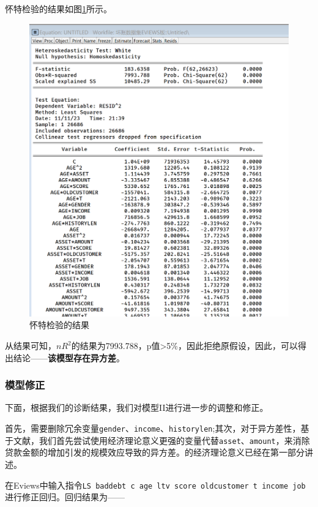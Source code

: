 \documentclass[13.5pt,hyperref,a4paper,UTF8]{ctexart}
\begin{document}
怀特检验的结果如图\ref{怀特检验的结果}所示。

\begin{figure}[H]
    \centering
    \includegraphics[width=1\linewidth]{figures//3回归//回归2/怀特检验的结果.png}
    \caption{怀特检验的结果}
    \label{怀特检验的结果}
\end{figure}

从结果可知，$nR^2$的结果为7993.788，p值>5\%，因此拒绝原假设，因此，可以得出结论——\textbf{该模型存在异方差}。


\subsubsection{模型修正}

下面，根据我们的诊断结果，我们对模型II进行进一步的调整和修正。

首先，需要删除冗余变量\texttt{gender}、\texttt{income}、\texttt{historylen};其次，对于异方差性，基于文献，我们首先尝试使用经济理论意义更强的变量代替\texttt{asset}、\texttt{amount}，来消除贷款金额的增加引发的规模效应导致的异方差。的经济理论意义已经在第一部分讲述。

在Eviews中输入指令\texttt{LS baddebt c age ltv score oldcustomer t income job}进行修正回归。回归结果为——
\end{document}
